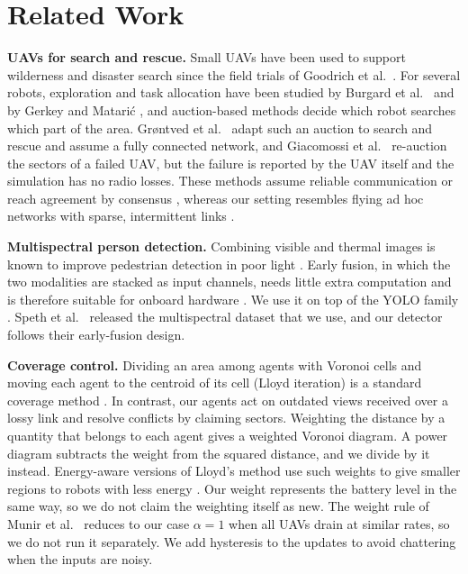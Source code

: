 \documentclass[conference]{IEEEtran}
\begin{document}
\section{Related Work}\label{sec:related}
\textbf{UAVs for search and rescue.} Small UAVs have been used to support wilderness and disaster search since the field trials of Goodrich et al.\ \cite{goodrich2008}. For several robots, exploration and task allocation have been studied by Burgard et al.\ \cite{burgard2005} and by Gerkey and Matari\'c \cite{gerkey2004}, and auction-based methods decide which robot searches which part of the area. Grøntved et al.\ \cite{grontved2023} adapt such an auction to search and rescue and assume a fully connected network, and Giacomossi et al.\ \cite{giacomossi2026} re-auction the sectors of a failed UAV, but the failure is reported by the UAV itself and the simulation has no radio losses. These methods assume reliable communication or reach agreement by consensus \cite{olfatisaber2007}, whereas our setting resembles flying ad hoc networks with sparse, intermittent links \cite{bekmezci2013}.

\textbf{Multispectral person detection.} Combining visible and thermal images is known to improve pedestrian detection in poor light \cite{hwang2015kaist,jia2021llvip}. Early fusion, in which the two modalities are stacked as input channels, needs little extra computation and is therefore suitable for onboard hardware \cite{speth2022}. We use it on top of the YOLO family \cite{redmon2016yolo,jocher2024yolo11}. Speth et al.\ \cite{speth2022} released the multispectral dataset that we use, and our detector follows their early-fusion design.

\textbf{Coverage control.} Dividing an area among agents with Voronoi cells and moving each agent to the centroid of its cell (Lloyd iteration) is a standard coverage method \cite{lloyd1982,du1999cvt,cortes2004coverage}. In contrast, our agents act on outdated views received over a lossy link and resolve conflicts by claiming sectors. Weighting the distance by a quantity that belongs to each agent gives a weighted Voronoi diagram. A power diagram \cite{aurenhammer1987power} subtracts the weight from the squared distance, and we divide by it instead. Energy-aware versions of Lloyd's method use such weights to give smaller regions to robots with less energy \cite{kwok2007,munir2024}. Our weight represents the battery level in the same way, so we do not claim the weighting itself as new. The weight rule of Munir et al.\ \cite{munir2024} reduces to our case $\alpha=1$ when all UAVs drain at similar rates, so we do not run it separately. We add hysteresis to the updates to avoid chattering when the inputs are noisy.
\end{document}
